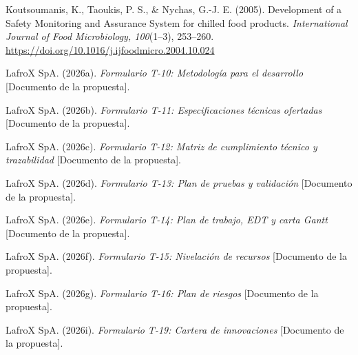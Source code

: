 \begin{list}{}{\setlength{\leftmargin}{1.27cm}\setlength{\itemindent}{-1.27cm}\setlength{\itemsep}{0.4em}\setlength{\parsep}{0pt}}
  \item Koutsoumanis, K., Taoukis, P. S., \& Nychas, G.-J. E. (2005). Development of a Safety Monitoring and Assurance System for chilled food products. \emph{International Journal of Food Microbiology, 100}(1–3), 253–260. \url{https://doi.org/10.1016/j.ijfoodmicro.2004.10.024}
  \item \begin{samepage}LafroX SpA. (2026a). \emph{Formulario T-10: Metodología para el desarrollo} [Documento de la propuesta].\par\end{samepage}
  \item \begin{samepage}LafroX SpA. (2026b). \emph{Formulario T-11: Especificaciones técnicas ofertadas} [Documento de la propuesta].\par\end{samepage}
  \item \begin{samepage}LafroX SpA. (2026c). \emph{Formulario T-12: Matriz de cumplimiento técnico y trazabilidad} [Documento de la propuesta].\par\end{samepage}
  \item \begin{samepage}LafroX SpA. (2026d). \emph{Formulario T-13: Plan de pruebas y validación} [Documento de la propuesta].\par\end{samepage}
  \item \begin{samepage}LafroX SpA. (2026e). \emph{Formulario T-14: Plan de trabajo, EDT y carta Gantt} [Documento de la propuesta].\par\end{samepage}
  \item \begin{samepage}LafroX SpA. (2026f). \emph{Formulario T-15: Nivelación de recursos} [Documento de la propuesta].\par\end{samepage}
  \item \begin{samepage}LafroX SpA. (2026g). \emph{Formulario T-16: Plan de riesgos} [Documento de la propuesta].\par\end{samepage}
  \item \begin{samepage}LafroX SpA. (2026i). \emph{Formulario T-19: Cartera de innovaciones} [Documento de la propuesta].\par\end{samepage}

\end{list}
